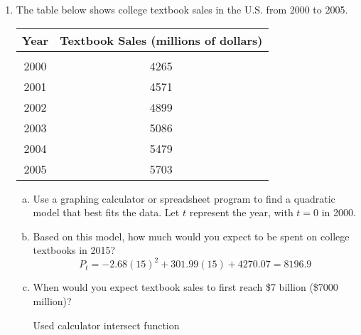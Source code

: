 \begin{enumerate}
\item The table below shows college textbook sales in the U.S. from 2000 to 2005.
\begin{center}
\begin{tabular}{c c}
\textbf{Year} & \textbf{Textbook Sales (millions of dollars)}\\
\hline
 & \\
2000 & 4265\\
2001 & 4571\\
2002 & 4899\\
2003 & 5086\\
2004 & 5479\\
2005 & 5703
\end{tabular}
\end{center}
\begin{enumerate}[(a)]
\item Use a graphing calculator or spreadsheet program to find a quadratic model that best fits the data.  Let $t$ represent the year, with $t=0$ in 2000. 
\item Based on this model, how much would you expect to be spent on college textbooks in 2015? 
\[P_t = -2.68(15)^2 + 301.99(15) + 4270.07 = 8196.9\]
\item When would you expect textbook sales to first reach \$7 billion (\$7000 million)? 
\begin{center}
Used calculator intersect function
\end{center}
\end{enumerate}


\end{enumerate}
